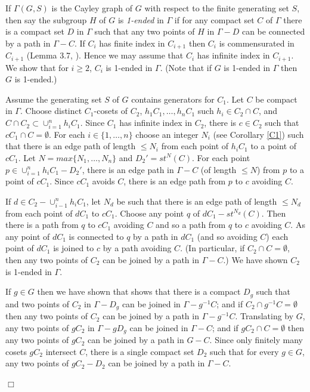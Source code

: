 \documentclass[12pt]{article}
\newenvironment{proof}{\addvspace{12pt}\noindent{\bf Proof:}}{
$\Box$\par\addvspace{12pt}}
\begin{document}
\begin{proof}  
If $\Gamma(G,S)$ is the Cayley graph of $G$ with respect to the finite generating set $S$, then say the subgroup $H$ of $G$ is {\it 1-ended} in $\Gamma$ if for any compact set $C$ of $\Gamma$ there is a compact set $D$ in $\Gamma$ such that any two points of $H$ in $\Gamma-D$ can be connected by a path in $\Gamma-C$. If $C_i$ has finite index in $C_{i+1}$ then $C_i$ is commensurated in $C_{i+1}$ (Lemma 3.7, \cite{CM13}). Hence we may assume that $C_i$ has infinite index in $C_{i+1}$. 
We show that for $i\geq 2$, $C_i$ is 1-ended in $\Gamma$. (Note that if $G$ is 1-ended in $\Gamma$ then $G$ is 1-ended.)


Assume the generating set $S$ of $G$ contains generators for $C_1$. Let $C$ be compact in $\Gamma$. Choose distinct $C_1$-cosets of $C_2$, $h_1C_1, \ldots, h_nC_1$ such $h_i\in C_2\cap C$, and $C\cap C_2\subset \cup_{i=1}^n h_iC_1$. Since $C_1$ has infinite index in $C_2$, there is $c\in C_2$ such that $cC_1\cap C=\emptyset$.  For each $i\in \{1,\ldots, n\}$ choose an integer $N_i$ (see Corollary \ref{C1}) such that there is an edge path of length $\leq N_i$ from each point of $h_iC_1$ to a point of $cC_1$. Let $N=max\{N_1,\ldots, N_n\}$ and $D_2'=st^N(C)$. For each point $p\in \cup_{i=1}^nh_iC_1-D_2'$, there is an edge path in $\Gamma-C$ (of length $\leq N$) from $p$ to a point of $cC_1$. Since $cC_1$ avoids $C$, there is an edge path from $p$ to $c$ avoiding $C$. 

If $d\in C_2-\cup _{i-1}^nh_iC_1$, let $N_d$ be such that there is an edge path of length $\leq N_d$ from each point of $dC_1$ to $cC_1$. Choose any point $q$ of $dC_1-st^{N_d}(C)$. Then there is a path from $q$ to $cC_1$ avoiding $C$ and so a path from $q$ to $c$ avoiding $C$. As any point of $dC_1$ is connected to $q$ by a path in $dC_1$ (and so avoiding $C$)  each point of $dC_1$ is joined to $c$ by a path avoiding $C$. (In particular, if $C_2\cap C=\emptyset$, then any two points of $ C_2$ can be joined by a path in $\Gamma-C$.) We have shown $C_2$ is 1-ended in $\Gamma$. 

If $g\in G$ then we have shown that shows that there is a compact $D_g$ such that and two points of  $C_2$ in $\Gamma-D_g$ can be joined in $\Gamma-g^{-1}C$; and if $C_2\cap g^{-1}C=\emptyset$ then any two points of $C_2$ can be joined by a path in $\Gamma-g^{-1}C$. Translating by $G$, any two points of $gC_2$ in $\Gamma-gD_g$ can be joined in $\Gamma-C$; and if $gC_2\cap C=\emptyset$ then any two points of $gC_2$ can be joined by a path in $G-C$. Since only finitely many cosets $gC_2$ intersect $C$, there is a single compact set $D_2$ such that for every $g\in G$, any two points of $gC_2-D_2$ can be joined by a path in $\Gamma-C$.


\end{proof}
\end{document}
